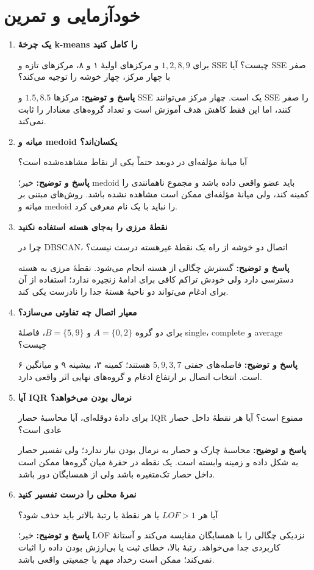 \documentclass[12pt,a4paper,oneside]{report}
\newcounter{ex}[chapter]
\newenvironment{selftests}{\begin{enumerate}\setlength{\itemsep}{9pt}}{\end{enumerate}}
\newenvironment{selftest}[1]{\item\textbf{#1}\par}{\par}
\newcommand{\answer}[1]{\par{\color{teal}\bfseries پاسخ و توضیح: }#1\par}
\begin{document}
\section{خودآزمایی و تمرین}
\begin{selftests}
\begin{selftest}{یک چرخهٔ k-means را کامل کنید}
برای $1,2,8,9$ و مرکزهای اولیهٔ ۱ و ۸، مرکزهای تازه و SSE چیست؟ آیا SSE صفر با چهار مرکز، چهار خوشه را توجیه می‌کند؟
\answer{مرکزها $1.5,8.5$ و SSE یک است. چهار مرکز می‌توانند SSE را صفر کنند، اما این فقط کاهش هدف آموزش است و تعداد گروه‌های معنادار را ثابت نمی‌کند.}
\end{selftest}
\begin{selftest}{میانه و medoid یکسان‌اند؟}
آیا میانهٔ مؤلفه‌ای در دوبعد حتماً یکی از نقاط مشاهده‌شده است؟
\answer{خیر؛ medoid باید عضو واقعی داده باشد و مجموع ناهمانندی را کمینه کند، ولی میانهٔ مؤلفه‌ای ممکن است مشاهده نشده باشد. روش‌های مبتنی بر میانه و medoid را نباید با یک نام معرفی کرد.}
\end{selftest}
\begin{selftest}{نقطهٔ مرزی را به‌جای هسته استفاده نکنید}
چرا در DBSCAN، اتصال دو خوشه از راه یک نقطهٔ غیرهسته درست نیست؟
\answer{گسترش چگالی از هسته انجام می‌شود. نقطهٔ مرزی به هسته دسترسی دارد ولی خودش تراکم کافی برای ادامهٔ زنجیره ندارد؛ استفاده از آن برای ادغام می‌تواند دو ناحیهٔ هستهٔ جدا را نادرست یکی کند.}
\end{selftest}
\begin{selftest}{معیار اتصال چه تفاوتی می‌سازد؟}
برای دو گروه $A=\{0,2\}$ و $B=\{5,9\}$، فاصلهٔ single، complete و average چیست؟
\answer{فاصله‌های جفتی $5,9,3,7$ هستند؛ کمینه ۳، بیشینه ۹ و میانگین ۶ است. انتخاب اتصال بر ارتفاع ادغام و گروه‌های نهایی اثر واقعی دارد.}
\end{selftest}
\begin{selftest}{آیا IQR نرمال بودن می‌خواهد؟}
برای دادهٔ دو‌قله‌ای، آیا محاسبهٔ حصار IQR ممنوع است؟ آیا هر نقطهٔ داخل حصار عادی است؟
\answer{محاسبهٔ چارک و حصار به نرمال بودن نیاز ندارد؛ ولی تفسیر حصار به شکل داده و زمینه وابسته است. یک نقطه در حفرهٔ میان گروه‌ها ممکن است داخل حصار تک‌متغیره باشد ولی از همسایگان دور باشد.}
\end{selftest}
\begin{selftest}{نمرهٔ محلی را درست تفسیر کنید}
آیا هر $LOF>1$ یا هر نقطهٔ با رتبهٔ بالاتر باید حذف شود؟
\answer{خیر؛ LOF نزدیکی چگالی را با همسایگان مقایسه می‌کند و آستانهٔ کاربردی جدا می‌خواهد. رتبهٔ بالا، خطای ثبت یا بی‌ارزش بودن داده را اثبات نمی‌کند؛ ممکن است رخداد مهم یا جمعیتی واقعی باشد.}
\end{selftest}
\end{selftests}
\end{document}
